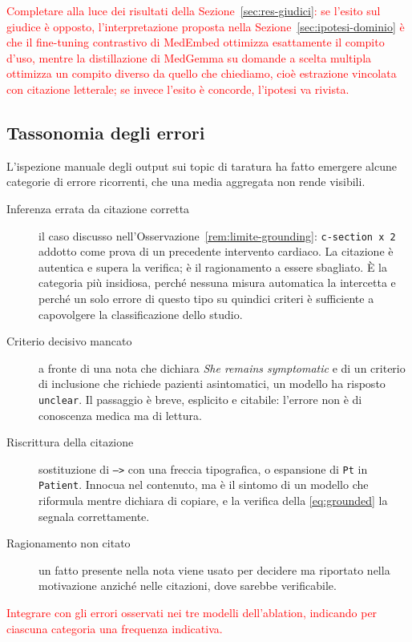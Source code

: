 \documentclass[pdflatex,sn-mathphys-num]{sn-jnl}
\theoremstyle{thmstyleone}
\theoremstyle{thmstyletwo}
\theoremstyle{thmstylethree}
\newcommand{\ev}[1]{\textcolor{red}{#1}}
\begin{document}
\ev{Completare alla luce dei risultati della Sezione~\ref{sec:res-giudici}: se l'esito sul giudice è opposto, l'interpretazione proposta nella Sezione~\ref{sec:ipotesi-dominio} è che il fine-tuning contrastivo di MedEmbed ottimizza esattamente il compito d'uso, mentre la distillazione di MedGemma su domande a scelta multipla ottimizza un compito diverso da quello che chiediamo, cioè estrazione vincolata con citazione letterale; se invece l'esito è concorde, l'ipotesi va rivista.}

\subsection{Tassonomia degli errori}\label{sec:disc-errori}

L'ispezione manuale degli output sui topic di taratura ha fatto emergere alcune categorie di errore ricorrenti, che una media aggregata non rende visibili.

\begin{description}
  \item[Inferenza errata da citazione corretta] il caso discusso nell'Osservazione~\ref{rem:limite-grounding}: \texttt{c-section x 2} addotto come prova di un precedente intervento cardiaco. La citazione è autentica e supera la verifica; è il ragionamento a essere sbagliato. È la categoria più insidiosa, perché nessuna misura automatica la intercetta e perché un solo errore di questo tipo su quindici criteri è sufficiente a capovolgere la classificazione dello studio.
  \item[Criterio decisivo mancato] a fronte di una nota che dichiara \emph{She remains symptomatic} e di un criterio di inclusione che richiede pazienti asintomatici, un modello ha risposto \texttt{unclear}. Il passaggio è breve, esplicito e citabile: l'errore non è di conoscenza medica ma di lettura.
  \item[Riscrittura della citazione] sostituzione di \texttt{-->} con una freccia tipografica, o espansione di \texttt{Pt} in \texttt{Patient}. Innocua nel contenuto, ma è il sintomo di un modello che riformula mentre dichiara di copiare, e la verifica della \eqref{eq:grounded} la segnala correttamente.
  \item[Ragionamento non citato] un fatto presente nella nota viene usato per decidere ma riportato nella motivazione anziché nelle citazioni, dove sarebbe verificabile.
\end{description}

\ev{Integrare con gli errori osservati nei tre modelli dell'ablation, indicando per ciascuna categoria una frequenza indicativa.}
\end{document}
